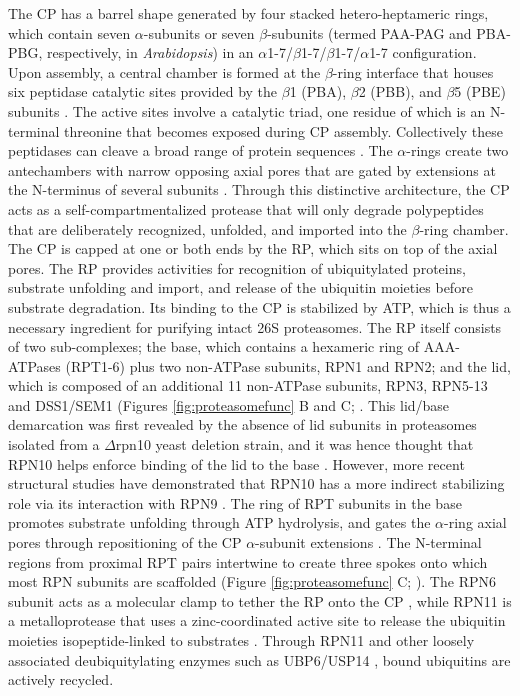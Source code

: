 	 The CP has a barrel shape generated by four stacked hetero-heptameric rings, which contain seven $\alpha$-subunits or seven $\beta$-subunits (termed PAA-PAG and PBA-PBG, respectively, in \textit{Arabidopsis}) in an $\alpha$1-7/$\beta$1-7/$\beta$1-7/$\alpha$1-7 configuration.  Upon assembly, a central chamber is formed at the $\beta$-ring interface that houses six peptidase catalytic sites provided by the $\beta$1 (PBA), $\beta$2 (PBB), and $\beta$5 (PBE) subunits \citep{arendt97, heinemeyer97}.  The active sites involve a catalytic triad, one residue of which is an N-terminal threonine that becomes exposed during CP assembly.  Collectively these peptidases can cleave a broad range of protein sequences \citep{arendt97, groll99}.  The $\alpha$-rings create two antechambers with narrow opposing axial pores that are gated by extensions at the N-terminus of several subunits \citep{groll00, ruschak10}.  Through this distinctive architecture, the CP acts as a self-compartmentalized protease that will only degrade polypeptides that are deliberately recognized, unfolded, and imported into the $\beta$-ring chamber. 
The CP is capped at one or both ends by the RP, which sits on top of the axial pores.  The RP provides activities for recognition of ubiquitylated proteins, substrate unfolding and import, and release of the ubiquitin moieties before substrate degradation.  Its binding to the CP is stabilized by ATP, which is thus a necessary ingredient for purifying intact 26S proteasomes.  The RP itself consists of two sub-complexes; the base, which contains a hexameric ring of AAA-ATPases (RPT1-6) plus two non-ATPase subunits, RPN1 and RPN2; and the lid, which is composed of an additional 11 non-ATPase subunits, RPN3, RPN5-13 and DSS1/SEM1 (Figures \ref{fig:proteasomefunc} B and C; \citep{bhattacharyya14, book10, finley09, glickman98-c8Wsa, russell13}.  This lid/base demarcation was first revealed by the absence of lid subunits in proteasomes isolated from a $\Delta$rpn10 yeast deletion strain, and it was hence thought that RPN10 helps enforce binding of the lid to the base \citep{glickman98}.  However, more recent structural studies have demonstrated that RPN10 has a more indirect stabilizing role via its interaction with RPN9 \citep{lander12}.  The ring of RPT subunits in the base promotes substrate unfolding through ATP hydrolysis, and gates the $\alpha$-ring axial pores through repositioning of the CP $\alpha$-subunit extensions \citep{köhler01, rabl08, smith05}.  The N-terminal regions from proximal RPT pairs intertwine to create three spokes onto which most RPN subunits are scaffolded (Figure \ref{fig:proteasomefunc} C; \citep{beck12}).  The RPN6 subunit acts as a molecular clamp to tether the RP onto the CP \citep{pathare12}, while RPN11 is a metalloprotease that uses a zinc-coordinated active site to release the ubiquitin moieties isopeptide-linked to substrates \citep{verma02, worden14}.  Through RPN11 and other loosely associated deubiquitylating enzymes such as UBP6/USP14 \citep{hanna06, sakata11}, bound ubiquitins are actively recycled.
